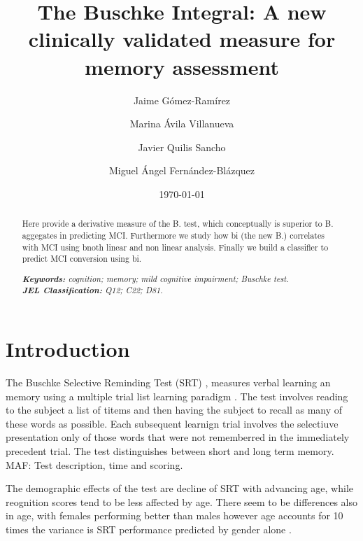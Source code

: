 \documentclass[11pt]{article}
\title{The Buschke Integral: A new clinically validated measure for memory assessment
}
\author{Jaime G\'omez-Ram\'irez\\%
\and Marina \'Avila Villanueva\\%
\and Javier Quilis Sancho\\%
\and Miguel \'Angel Fern\'andez-Bl\'azquez\\%
    }
\date{\today}
\begin{document}
{
\maketitle
\begin{abstract}
Here provide a derivative measure of the B. test, which conceptually is superior to B. aggegates in predicting MCI. Furthermore we study how bi (the new B.) correlates with MCI using bnoth linear and non linear analysis. Finally we build a classifier to predict MCI conversion using bi.

 \noindent
\textit{\textbf{Keywords: }%
cognition; memory; mild cognitive impairment; Buschke test.} \\ %
\noindent
\textit{\textbf{JEL Classification: }%
Q12; C22; D81.} %

\end{abstract}
}


\section{Introduction}

The Buschke Selective Reminding Test (SRT) \cite{buschke1973selective}, \cite{buschke1974evaluating} measures verbal learning an memory using a multiple trial list learning paradigm \cite{strauss2006compendium}. The test involves reading to the subject a list of titems and then having the subject to recall as many of these words as possible. Each subsequent learnign trial involves the selectiuve presentation only of those words that were not rememberred in the immediately precedent trial.
The test distinguishes between short and long term memory.
MAF: Test description, time and scoring.

The demographic effects of the test are decline of SRT with advancing age, while reognition scores tend to be less affected by age. There seem to be differences also in age, with females performing better than males however age accounts for 10 times the variance is SRT performance predicted by gender alone \cite{larrabee1988normative}.
\end{document}
